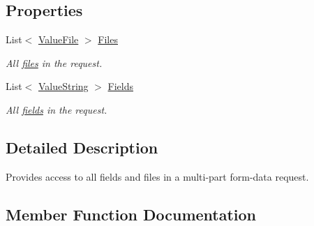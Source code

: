 \subsection*{Properties}
\begin{DoxyCompactItemize}
\item 
List$<$ \hyperlink{classCqrs_1_1WebApi_1_1Formatters_1_1FormMultipart_1_1Infrastructure_1_1FormData_1_1ValueFile}{Value\+File} $>$ \hyperlink{classCqrs_1_1WebApi_1_1Formatters_1_1FormMultipart_1_1Infrastructure_1_1FormData_a09da7b76f703fc20899051d9d9ed17b0_a09da7b76f703fc20899051d9d9ed17b0}{Files}
\begin{DoxyCompactList}\small\item\em All \hyperlink{classCqrs_1_1WebApi_1_1Formatters_1_1FormMultipart_1_1Infrastructure_1_1FormData_1_1ValueFile}{files} in the request. \end{DoxyCompactList}\item 
List$<$ \hyperlink{classCqrs_1_1WebApi_1_1Formatters_1_1FormMultipart_1_1Infrastructure_1_1FormData_1_1ValueString}{Value\+String} $>$ \hyperlink{classCqrs_1_1WebApi_1_1Formatters_1_1FormMultipart_1_1Infrastructure_1_1FormData_a91cfdcbb3a074aadee7e7fc228c04a6a_a91cfdcbb3a074aadee7e7fc228c04a6a}{Fields}
\begin{DoxyCompactList}\small\item\em All \hyperlink{classCqrs_1_1WebApi_1_1Formatters_1_1FormMultipart_1_1Infrastructure_1_1FormData_1_1ValueString}{fields} in the request. \end{DoxyCompactList}\end{DoxyCompactItemize}


\subsection{Detailed Description}
Provides access to all fields and files in a multi-\/part form-\/data request. 



\subsection{Member Function Documentation}
\mbox{\label{classCqrs_1_1WebApi_1_1Formatters_1_1FormMultipart_1_1Infrastructure_1_1FormData_a901e35133be31392947951d78632e593_a901e35133be31392947951d78632e593}} 
